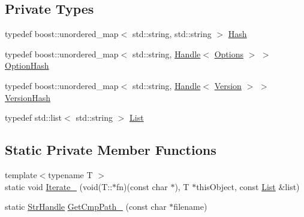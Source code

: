 \subsection*{Private Types}
\begin{DoxyCompactItemize}
\item 
typedef boost::unordered\_\-map$<$ std::string, std::string $>$ \hyperlink{classmocha_1_1_x_m_l_setting_info_a2954735e05daa0b58bebbe20124aeb94}{Hash}
\item 
typedef boost::unordered\_\-map$<$ std::string, \hyperlink{classmocha_1_1_handle}{Handle}$<$ \hyperlink{classmocha_1_1_options}{Options} $>$ $>$ \hyperlink{classmocha_1_1_x_m_l_setting_info_a8346f24b51b8fe9ada57eab1731be3e5}{OptionHash}
\item 
typedef boost::unordered\_\-map$<$ std::string, \hyperlink{classmocha_1_1_handle}{Handle}$<$ \hyperlink{classmocha_1_1_version}{Version} $>$ $>$ \hyperlink{classmocha_1_1_x_m_l_setting_info_a7166e12491f90d077bf46befe42e5f31}{VersionHash}
\item 
typedef std::list$<$ std::string $>$ \hyperlink{classmocha_1_1_x_m_l_setting_info_aaf66398a517745d0580193a8f89624f2}{List}
\end{DoxyCompactItemize}
\subsection*{Static Private Member Functions}
\begin{DoxyCompactItemize}
\item 
{\footnotesize template$<$typename T $>$ }\\static void \hyperlink{classmocha_1_1_x_m_l_setting_info_a0465bdaa8ca4c793d939d7cf7e1ca277}{Iterate\_\-} (void(T::$\ast$fn)(const char $\ast$), T $\ast$thisObject, const \hyperlink{classmocha_1_1_x_m_l_setting_info_aaf66398a517745d0580193a8f89624f2}{List} \&list)
\item 
static \hyperlink{classmocha_1_1_array_handle}{StrHandle} \hyperlink{classmocha_1_1_x_m_l_setting_info_ab10c44cdc61f3f07cf0dae0c14d4a7ee}{GetCmpPath\_\-} (const char $\ast$filename)
\end{DoxyCompactItemize}
